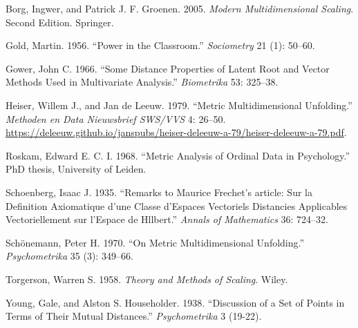\documentclass[
  12pt,
  letterpaper,
  DIV=11,
  numbers=noendperiod]{scrartcl}
\newlength{\cslhangindent}
\newenvironment{CSLReferences}[2] %
 {\begin{list}{}{%
  \setlength{\itemindent}{0pt}
  \setlength{\leftmargin}{0pt}
  \setlength{\parsep}{0pt}
  \ifodd #1
   \setlength{\leftmargin}{\cslhangindent}
   \setlength{\itemindent}{-1\cslhangindent}
  \fi
  \setlength{\itemsep}{#2\baselineskip}}}
 {\end{list}}
\begin{document}
\protect{}\label{refs}
\begin{CSLReferences}{1}{1}
Borg, Ingwer, and Patrick J. F. Groenen. 2005. \emph{Modern
Multidimensional Scaling}. Second Edition. Springer.

Gold, Martin. 1956. {``Power in the Classroom.''} \emph{Sociometry} 21
(1): 50--60.

Gower, John C. 1966. {``{Some Distance Properties of Latent Root and
Vector Methods Used in Multivariate Analysis}.''} \emph{Biometrika} 53:
325--38.

{Heiser, Willem J., and Jan de Leeuw}. 1979. {``{Metric Multidimensional
Unfolding}.''} \emph{{Methoden en Data Nieuwsbrief SWS/VVS}} 4: 26--50.
\url{https://deleeuw.github.io/janspubs/heiser-deleeuw-a-79/heiser-deleeuw-a-79.pdf}.

Roskam, Edward E. C. I. 1968. {``{Metric Analysis of Ordinal Data in
Psychology}.''} PhD thesis, University of Leiden.

Schoenberg, Isaac J. 1935. {``{Remarks to Maurice Frechet's article: Sur
la Definition Axiomatique d'une Classe d'Espaces Vectoriels Distancies
Applicables Vectoriellement sur l'Espace de Hllbert}.''} \emph{Annals of
Mathematics} 36: 724--32.

Schönemann, Peter H. 1970. {``{On Metric Multidimensional Unfolding}.''}
\emph{Psychometrika} 35 (3): 349--66.

Torgerson, Warren S. 1958. \emph{{Theory and Methods of Scaling}}.
Wiley.

Young, Gale, and Alston S. Householder. 1938. {``{Discussion of a Set of
Points in Terms of Their Mutual Distances}.''} \emph{Psychometrika} 3
(19-22).

\end{CSLReferences}
\end{document}
